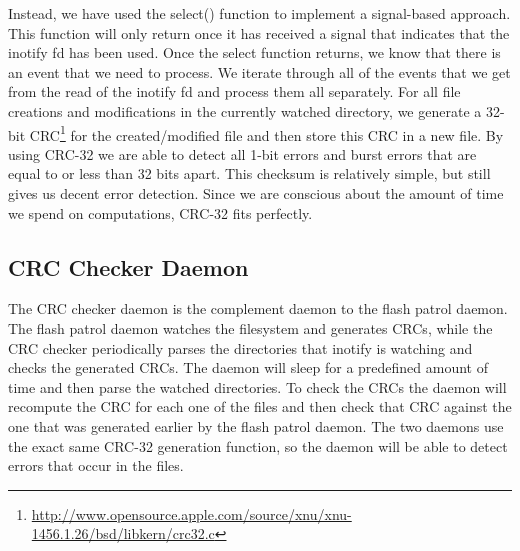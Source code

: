 Instead, we have used the select() function to implement a signal-based approach. This function
will only return once it has received a signal that indicates that the inotify fd has been used.
Once the select function returns, we know that there is an event that we need to process. We iterate
through all of the events that we get from the read of the inotify fd and process them all separately.
For all file creations and modifications in the currently watched directory, we generate a 32-bit 
CRC\footnote{\url{http://www.opensource.apple.com/source/xnu/xnu-1456.1.26/bsd/libkern/crc32.c}} 
for the created/modified file and then store this CRC in a new file. By using CRC-32 we are
able to detect all 1-bit errors and burst errors that are equal to or less than 32 bits apart. This checksum is
relatively simple, but still gives us decent error detection. Since we are conscious about the amount
of time we spend on computations, CRC-32 fits perfectly. 

\subsection{CRC Checker Daemon}
The CRC checker daemon is the complement daemon to the flash patrol daemon. The flash
patrol daemon watches the filesystem and generates CRCs, while the CRC checker periodically
parses the directories that inotify is watching and checks the generated CRCs. The daemon will 
sleep for a predefined amount of time and then parse the watched directories. To check the CRCs
the daemon will recompute the CRC for each one of the files and then check that CRC against the
one that was generated earlier by the flash patrol daemon. The two daemons use the exact same
CRC-32 generation function, so the daemon will be able to detect errors that occur in the 
files. 














